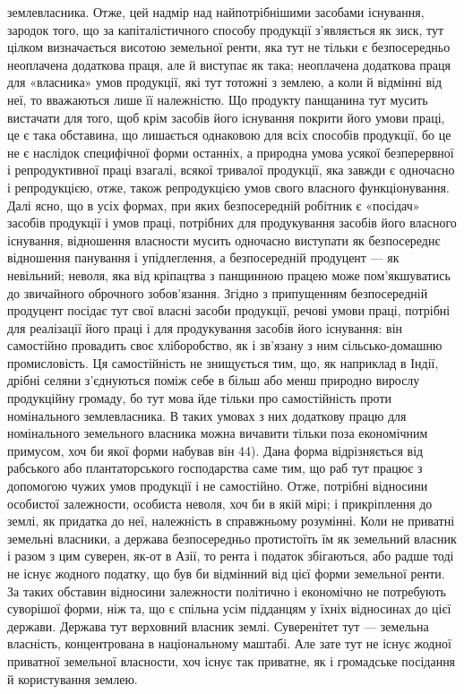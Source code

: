 землевласника. Отже, цей надмір над найпотрібнішими засобами існування, зародок
того, що за капіталістичного способу продукції з’являється як зиск,
тут цілком визначається висотою земельної ренти, яка тут не тільки
є безпосередньо неоплачена додаткова праця, але й виступає як така; неоплачена
додаткова праця для «власника» умов продукції, які тут тотожні з землею, а коли
й відмінні від неї, то вважаються лише її належністю. Що продукту панщанина тут
мусить вистачати для того, щоб крім засобів його існування покрити його умови
праці, це є така обставина, що лишається однаковою для всіх способів продукції,
бо це не є наслідок специфічної форми останніх, а природна умова усякої безперервної
і репродуктивної праці взагалі, всякої тривалої продукції, яка завжди
є одночасно і репродукцією, отже, також репродукцією умов свого власного функціонування.
Далі ясно, що в усіх формах, при яких безпосередній робітник є
«посідач» засобів продукції і умов праці, потрібних для продукування засобів
його власного існування, відношення власности мусить одночасно виступати
як безпосереднє відношення панування і упідлеглення, а безпосередній
продуцент — як невільний; неволя, яка від кріпацтва з панщинною працею
може пом’якшуватись до звичайного оброчного зобов’язання. Згідно з припущенням
безпосередній продуцент посідає тут свої власні засоби продукції,
речові умови праці, потрібні для реалізації його праці і для продукування
засобів його існування: він самостійно провадить своє хліборобство, як і
зв’язану з ним сільсько-домашню промисловість. Ця самостійність не знищується
тим, що, як наприклад в Індії, дрібні селяни з’єднуються поміж себе в
більш або менш природно вирослу продукційну громаду, бо тут мова йде тільки
про самостійність проти номінального землевласника. В таких умовах з них
додаткову працю для номінального земельного власника можна вичавити
тільки поза економічним примусом, хоч би якої форми набував він 44). Дана форма
відрізняється від рабського або плантаторського господарства саме тим, що раб
тут працює з допомогою чужих умов продукції і не самостійно. Отже, потрібні
відносини особистої залежности, особиста неволя, хоч би в якій мірі; і прикріплення
до землі, як придатка до неї, належність в справжньому розумінні.
Коли не приватні земельні власники, а держава безпосередньо протистоїть їм
як земельний власник і разом з цим суверен, як-от в Азії, то рента і податок
збігаються, або радше тоді не існує жодного податку, що був би відмінний від цієї
форми земельної ренти. За таких обставин відносини залежности політично і
економічно не потребують суворішої форми, ніж та, що є спільна усім підданцям
у їхніх відносинах до цієї держави. Держава тут верховний власник землі.
Суверенітет тут — земельна власність, концентрована в національному маштабі.
Але зате тут не існує жодної приватної земельної власности, хоч існує так
приватне, як і громадське посідання й користування землею.

